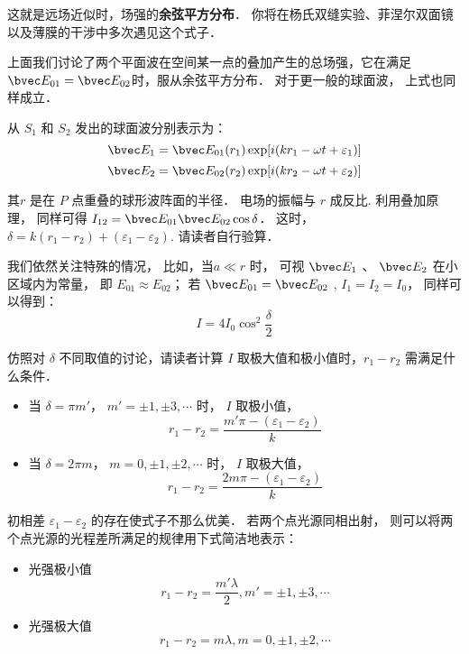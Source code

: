 这就是远场近似时，场强的\textbf{余弦平方分布}． 你将在杨氏双缝实验、菲涅尔双面镜以及薄膜的干涉中多次遇见这个式子．

上面我们讨论了两个平面波在空间某一点的叠加产生的总场强，它在满足 $ \bvec E_{01} = \bvec E_{02}$时，服从余弦平方分布． 对于更一般的球面波， 上式也同样成立． 

从 $ S_1 $ 和 $ S_2 $ 发出的球面波分别表示为：
$$ \bvec E_1 = \bvec E_{ 01 } ( r_1 ) \exp[ i( k r_1 - \omega t+ \varepsilon_1 )]$$
$$ \bvec E_2 = \bvec E_{ 02 } ( r_2 ) \exp[ i( k r_2 - \omega t+ \varepsilon_2 )]$$

其$ r $ 是在 $ P $ 点重叠的球形波阵面的半径． 电场的振幅与 $ r $ 成反比. 利用叠加原理， 同样可得 $I_{12} = \bvec E_{01}\bvec E_{02} \cos\delta$． 这时， $ \delta = k ( r_1 - r_2 ) + ( \varepsilon_1 - \varepsilon_2 )$.  请读者自行验算．

我们依然关注特殊的情况， 比如，当$ a \ll r $ 时， 可视 $ \bvec E_1$ 、 $ \bvec E_2$ 在小区域内为常量， 即 $ E_{ 01} \approx E_{02}$； 若 $ \bvec E_{01} = \bvec E_{02} $ , $ I_1 = I_2 = I_0 $， 同样可以得到：
\begin{equation}
 I = 4 I_0 \cos ^2\dfrac { \delta } { 2 }
\end{equation}

\begin{exercise}{}
仿照对 $ \delta$ 不同取值的讨论，请读者计算 $ I $ 取极大值和极小值时，$ r_1 - r_2 $ 需满足什么条件．
\end{exercise}

\begin{itemize}
\item 当 $ \delta = \pi m'$， $ m' = \pm 1, \pm 3, \cdots $ 时， $ I $ 取极小值， 
\begin{equation}
r_1 - r_2 = \dfrac{ m' \pi - ( \varepsilon _1 - \varepsilon _2)} { k }
\end{equation}
\item 当 $ \delta = 2 \pi m$， $ m = 0, \pm 1, \pm 2, \cdots $ 时， $ I $ 取极大值， 
\begin{equation}
 r_1 - r_2 = \dfrac{ 2m \pi - ( \varepsilon _1 - \varepsilon _2)} { k }
\end{equation}
\end{itemize}

初相差 $ \varepsilon_1 - \varepsilon_2 $ 的存在使式子不那么优美． 若两个点光源同相出射， 则可以将两个点光源的光程差所满足的规律用下式简洁地表示：

\begin{corollary}{}

\begin{itemize}
\item 光强极小值 
\begin{equation}
r_1 - r_2 = \dfrac{ m' \lambda} { 2 } , m' = \pm 1, \pm 3, \cdots
\end{equation}

\item 光强极大值 
\begin{equation}
 r_1 - r_2 = m \lambda , m = 0 , \pm 1, \pm 2,\cdots 
\end{equation}

\end{itemize}

\end{corollary}


